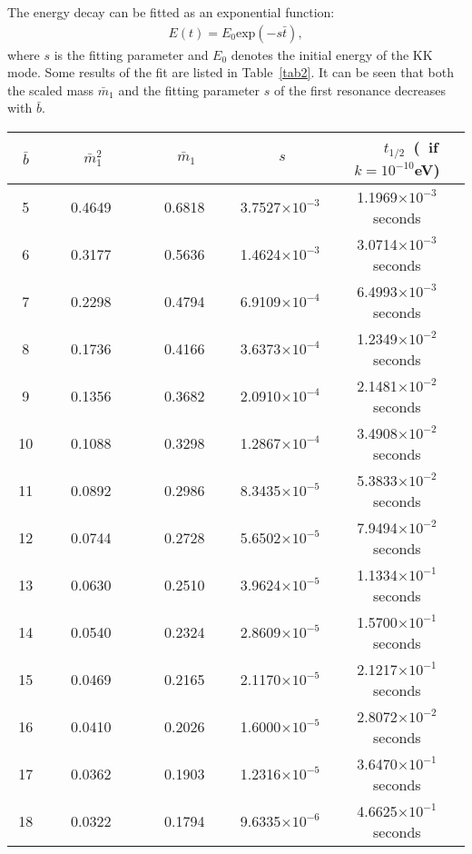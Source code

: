 The energy decay can be fitted as an exponential function:
\begin{eqnarray}
E(t)=E_{0}\text{exp}(-s\bar{t}),\label{energy decay}
\end{eqnarray}
where $s$ is the fitting parameter and $E_{0}$ denotes the initial energy of the KK mode. Some results of the fit are listed in Table~\ref{tab2}. It can be seen that both the scaled mass $\bar{m}_1$ and the fitting parameter $s$ of the first resonance decreases with $\bar{b}$.

\begin{table*}[htbp]
\begin{center}
\begin{tabular}{| c | c| c| c | c |}
\hline
$\;\;\bar{b}\;\;$  &
$\;\;\;\;\;\;\;\;\bar{m}_{1}^{2}\;\;\;\;\;\;\;$ &
$\;\;\;\;\;\;\;\;\bar{m}_{1}\;\;\;\;\;\;\;$ &
$\;\;\;\;\;\;\;\;\;\;s\;\;\;\;\;\;\;\;\;$  &
$\;\;\;\;\;\;\;\;\;t_{1/2}$~(~if~$k=10^{-10}$eV)\;\;\;\;\;\;\;\;\;\\
\hline
5       &  0.4649 & 0.6818  & 3.7527$\times10^{-3}$ & 1.1969$\times10^{-3}$seconds\\
\hline
6        &  0.3177 & 0.5636 & 1.4624$\times10^{-3}$ & 3.0714$\times10^{-3}$seconds\\
\hline
7        &  0.2298 & 0.4794  & 6.9109$\times10^{-4}$ & 6.4993$\times10^{-3}$seconds\\
\hline
8        &  0.1736 & 0.4166  & 3.6373$\times10^{-4}$ & 1.2349$\times10^{-2}$seconds\\
\hline
9        &  0.1356 & 0.3682  & 2.0910$\times10^{-4}$ & 2.1481$\times10^{-2}$seconds\\
\hline
10       &  0.1088 & 0.3298  & 1.2867$\times10^{-4}$ & 3.4908$\times10^{-2}$seconds\\
\hline
11       &  0.0892 & 0.2986  & 8.3435$\times10^{-5}$ & 5.3833$\times10^{-2}$seconds\\
\hline
12      &  0.0744 & 0.2728  & 5.6502$\times10^{-5}$ & 7.9494$\times10^{-2}$seconds\\
\hline
13         &  0.0630 & 0.2510  & 3.9624$\times10^{-5}$ & 1.1334$\times10^{-1}$seconds\\
\hline
14       &  0.0540 & 0.2324  & 2.8609$\times10^{-5}$ & 1.5700$\times10^{-1}$seconds\\
\hline
15        &  0.0469 & 0.2165  & 2.1170$\times10^{-5}$ & 2.1217$\times10^{-1}$seconds\\
\hline
16       &  0.0410 & 0.2026  & 1.6000$\times10^{-5}$ & 2.8072$\times10^{-2}$seconds\\
\hline
17       & 0.0362 & 0.1903  & 1.2316$\times10^{-5}$ & 3.6470$\times10^{-1}$seconds\\
\hline
18       &  0.0322 & 0.1794  & 9.6335$\times10^{-6}$ & 4.6625$\times10^{-1}$seconds\\
\hline
\end{tabular}
\end{center}
\caption{The first resonant mass spectrum $\bar{m}_{1}^{2}$, $\bar{m}_{1}$, fitting parameter $s$, and half-life $t_{1/2}$ for different values of the parameter $\bar{b}$.} \label{tab2}
\end{table*}


